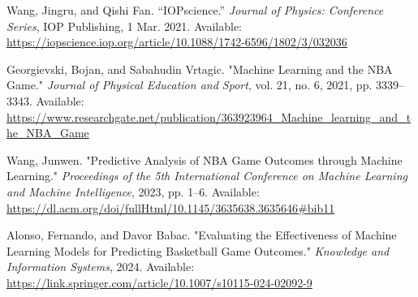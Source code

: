 \documentclass[12pt]{article}
\begin{document}
\begin{thebibliography}{9}

Wang, Jingru, and Qishi Fan. “IOPscience.” \textit{Journal of Physics: Conference Series}, IOP Publishing, 1 Mar. 2021. Available: \url{https://iopscience.iop.org/article/10.1088/1742-6596/1802/3/032036}

Georgievski, Bojan, and Sabahudin Vrtagic. "Machine Learning and the NBA Game." \textit{Journal of Physical Education and Sport}, vol. 21, no. 6, 2021, pp. 3339–3343. Available: \url{https://www.researchgate.net/publication/363923964_Machine_learning_and_the_NBA_Game}

Wang, Junwen. "Predictive Analysis of NBA Game Outcomes through Machine Learning." \textit{Proceedings of the 5th International Conference on Machine Learning and Machine Intelligence}, 2023, pp. 1–6. Available: \url{https://dl.acm.org/doi/fullHtml/10.1145/3635638.3635646#bib11}

Alonso, Fernando, and Davor Babac. "Evaluating the Effectiveness of Machine Learning Models for Predicting Basketball Game Outcomes." \textit{Knowledge and Information Systems}, 2024. Available: \url{https://link.springer.com/article/10.1007/s10115-024-02092-9}

\end{thebibliography}
\end{document}
